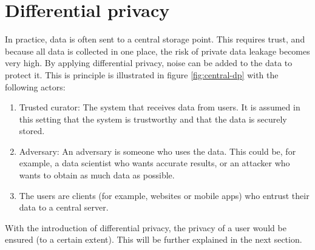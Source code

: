 % 
\section{Differential privacy} \label{section:dp}
In practice, data is often sent to a central storage point.
This requires trust, and because all data is collected in one place, the risk of private data leakage becomes very high.
By applying differential privacy, noise can be added to the data to protect it.
This is principle is illustrated in figure \ref{fig:central-dp} with the following actors:
\begin{enumerate}
  \item Trusted curator: The system that receives data from users. It is assumed in this setting that the system is trustworthy and that the data is securely stored.
  \item Adversary: An adversary is someone who uses the data. This could be, for example, a data scientist who wants accurate results, or an attacker who wants to obtain as much data as possible.
  \item The users are clients (for example, websites or mobile apps) who entrust their data to a central server.
\end{enumerate}
With the introduction of differential privacy, the privacy of a user would be ensured (to a certain extent).
This will be further explained in the next section.

